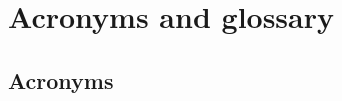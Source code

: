 \appendix
{}\chapter{Acronyms and glossary} %
\label{security:abbreviations}


\section{Acronyms}
\label{app:acronyms}

